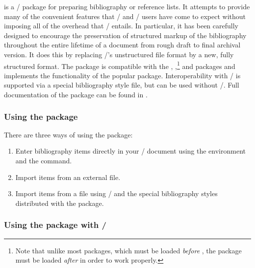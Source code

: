  is a \latex/ package for preparing bibliography or
reference lists.  It attempts to provide many of the convenient
features that \latex/ and \bibtex/ users have come to expect without
imposing all of the overhead that \bibtex/ entails.  In particular, it
has been carefully designed to encourage the preservation of
structured markup of the bibliography throughout the entire lifetime
of a document from rough draft to final archival version.
It does this by replacing \latex/'s unstructured  file
format by a new, fully structured format.  The package is compatible
with the , ,\footnote{Note that unlike
  most packages, which must be loaded \emph{before} ,
  the  package must be loaded \emph{after} 
  in order to work properly.} and  packages and
implements the functionality of the popular  package.
Interoperability with \bibtex/ is supported via a special bibliography
style file, but  can be used without \bibtex/. Full documentation
of the  package can be found in \cite{AMSR}.

\subsubsection{Using the  package}

There are three ways of using the  package:
\begin{enumerate}

\item
Enter bibliography items directly in your \latex/ document using the
 environment and the  command.

\item
Import items from an external  file.

\item
Import items from a  file using \bibtex/ and the special
bibliography styles distributed with the  package.

\end{enumerate}

\subsubsection{Using the  package with \bibtex/}

